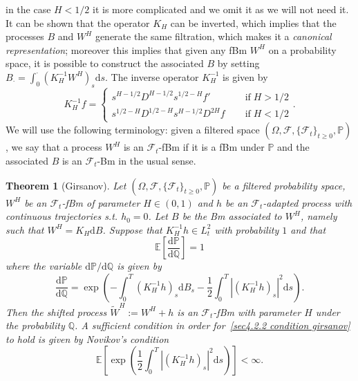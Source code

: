 \documentclass[10pt]{article}
\newcommand{\assign}{:=}
\newcommand{\mathd}{\mathrm{d}}
\newcommand{\tmem}[1]{{\em #1\/}}
\newcommand{\tmop}[1]{\ensuremath{\operatorname{#1}}}
\newtheorem{theorem}{Theorem}
\begin{document}
in the case $H < 1 / 2$ it is more complicated and we omit it as we will not
need it. It can be shown that the operator $K_H$ can be inverted, which
implies that the processes $B$ and $W^H$ generate the same filtration, which
makes it a {\tmem{canonical representation}}; moreover this implies that given
any fBm $W^H$ on a probability space, it is possible to construct the
associated $B$ by setting $B_{\cdot} = \int_0^{\cdot} (K^{- 1}_H W^H)_s \mathd
s$. The inverse operator $K_H^{- 1}$ is given by
\begin{equation}
  K^{- 1}_H f = \left\{\begin{array}{ll}
    s^{H - 1 / 2} D^{H - 1 / 2} s^{1 / 2 - H} f' & \tmop{if} H > 1 / 2\\
    s^{1 / 2 - H} D^{1 / 2 - H} s^{H - 1 / 2} D^{2 H} f \quad & \tmop{if} H <
    1 / 2
  \end{array}\right. . \label{sec4.2.2 inverse operator}
\end{equation}
We will use the following terminology: given a filtered space $(\Omega,
\mathcal{F}, \{ \mathcal{F}_t \}_{t \geqslant 0}, \mathbb{P})$, we say that a
process $W^H$ is an $\mathcal{F}_t$\mbox{-}fBm if it is a fBm under
$\mathbb{P}$ and the associated $B$ is an $\mathcal{F}_t$\mbox{-}Bm in the
usual sense.

\begin{theorem}[Girsanov]
  \label{sec4.2.2 girsanov thm}Let $(\Omega, \mathcal{F}, \{ \mathcal{F}_t
  \}_{t \geqslant 0}, \mathbb{P})$ be a filtered probability space, $W^H$ be
  an $\mathcal{F}_t$\mbox{-}fBm of parameter $H \in (0, 1)$ and $h$ be an
  $\mathcal{F}_t$\mbox{-}adapted process with continuous trajectories s.t.
  $h_0 = 0$. Let $B$ be the Bm associated to $W^H$, namely such that $W^H =
  K_H \mathd B$. Suppose that $K_H^{- 1} h \in L_t^2$ with probability $1$ and
  that
  \begin{equation}
    \mathbb{E} \left[ \frac{\mathd \mathbb{P}}{\mathd \mathbb{Q}} \right] = 1
    \label{sec4.2.2 condition girsanov}
  \end{equation}
  where the variable $\mathd \mathbb{P}/ \mathd \mathbb{Q}$ is given by
  \begin{equation}
    \frac{\mathd \mathbb{P}}{\mathd \mathbb{Q}} = \exp \left( - \int_0^T
    (K_H^{- 1} h)_s \mathd B_s - \frac{1}{2} \int_0^T | (K_H^{- 1} h)_s |^2
    \mathd s \right) . \label{sec4.2.2 density girsanov}
  \end{equation}
  Then the shifted process $\tilde{W}^H \assign W^H + h$ is an
  $\mathcal{F}_t$-fBm with parameter $H$ under the probability $\mathbb{Q}$. A
  sufficient condition in order for~{\eqref{sec4.2.2 condition girsanov}} to
  hold is given by Novikov's condition
  \begin{equation}
    \mathbb{E} \left[ \exp \left( \frac{1}{2} \int_0^T | (K_H^{- 1} h)_s |^2
    \mathd s \right) \right] < \infty . \label{sec4.2.2 novikov}
  \end{equation}
\end{theorem}
\end{document}
